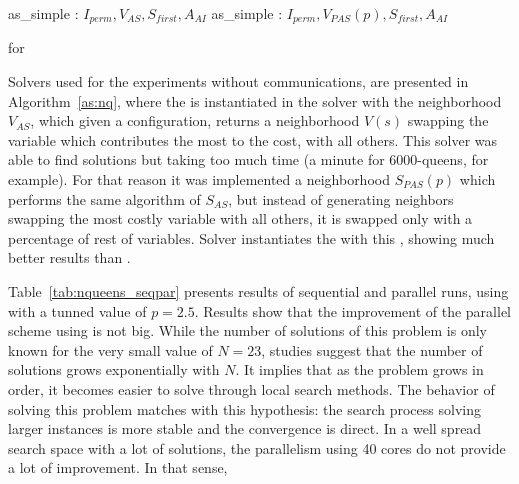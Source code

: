 \begin{algorithm}[H]
\dontprintsemicolon
\SetNoline
{}
   as\_simple\;
\algoindent {} : $I_{perm}, V_{AS}, S_{first}, A_{AI}$ \;
   as\_simple\;
\algoindent {} : $I_{perm}, V_{PAS}(p), S_{first}, A_{AI}$ \; 
\caption{\As{} for \NQP}\label{as:nq}
\end{algorithm}

Solvers used for the experiments without communications, are presented in Algorithm~\ref{as:nq}, where the \as{} is instantiated in the solver  with the neighborhood \om{} $V_{AS}$, which given a configuration, returns a neighborhood $V\left(s\right)$ swapping the variable which contributes the most to the cost, with all others. This solver was able to find solutions but taking too much time (a minute for 6000-queens, for example). For that reason it was implemented a neighborhood \om{} $S_{PAS}(p)$ which performs the same algorithm of $S_{AS}$, but instead of generating neighbors swapping the most costly variable with all others, it is swapped only with a percentage of rest of variables. Solver  instantiates the \as{} with this \om, showing much better results than .

Table~\ref{tab:nqueens_seqpar} presents results of sequential and parallel runs, using  with a tunned value of $p=2.5$. Results show that the improvement of the parallel scheme using \posl{} is not big. While the number of solutions of this problem is only known for the very small value of $N = 23$, studies suggest that the number of solutions grows exponentially with $N$. It implies that as the problem grows in order, it becomes easier to solve through local search methods. The behavior of \posl{} solving this problem matches  with this hypothesis: the search process solving larger instances is more stable and the convergence is direct. In a well spread search space with a lot of solutions, the parallelism using 40 cores do not provide a lot of improvement. In that sense, 

